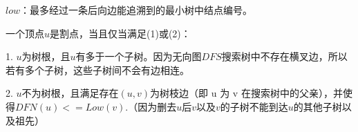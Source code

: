 $low$：最多经过一条后向边能追溯到的最小树中结点编号。

一个顶点$ u $是割点，当且仅当满足(1)或(2)：

1. $u $为树根，且$ u $有多于一个子树。因为无向图$ DFS $搜索树中不存在横叉边，所以若有多个子树，这些子树间不会有边相连。

2. $u $不为树根，且满足存在$(u,v)$为树枝边（即 u 为 v 在搜索树中的父亲），并使得$DFN(u)<=Low(v)$.（因为删去$u$后$v$以及$ v $的子树不能到达$ u $的其他子树以及祖先）